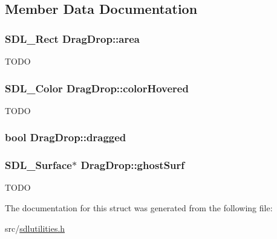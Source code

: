 \subsection{Member Data Documentation}
\hypertarget{structDragDrop_aaa9d7144adb66cd87910e73e84e0dfcb}{
\subsubsection[{area}]{\setlength{\rightskip}{0pt plus 5cm}SDL\_\-Rect {\bf DragDrop::area}}}
\label{structDragDrop_aaa9d7144adb66cd87910e73e84e0dfcb}
TODO \hypertarget{structDragDrop_ae8b5a2b5ceed22163e3572f6df9c9f89}{
\subsubsection[{colorHovered}]{\setlength{\rightskip}{0pt plus 5cm}SDL\_\-Color {\bf DragDrop::colorHovered}}}
\label{structDragDrop_ae8b5a2b5ceed22163e3572f6df9c9f89}
TODO \hypertarget{structDragDrop_a41aaa4bda1eed39e08b926b46101c723}{
\subsubsection[{dragged}]{\setlength{\rightskip}{0pt plus 5cm}bool {\bf DragDrop::dragged}}}
\label{structDragDrop_a41aaa4bda1eed39e08b926b46101c723}
\hypertarget{structDragDrop_a5ddaa34d10935b8d93a056b45893fb47}{
\subsubsection[{ghostSurf}]{\setlength{\rightskip}{0pt plus 5cm}SDL\_\-Surface$\ast$ {\bf DragDrop::ghostSurf}}}
\label{structDragDrop_a5ddaa34d10935b8d93a056b45893fb47}
TODO 

The documentation for this struct was generated from the following file:\begin{DoxyCompactItemize}
\item 
src/\hyperlink{sdlutilities_8h}{sdlutilities.h}\end{DoxyCompactItemize}
